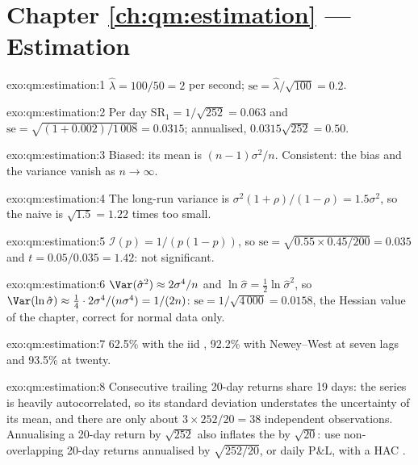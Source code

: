 \section*{Chapter \ref{ch:qm:estimation} --- Estimation}

\begin{solution}{exo:qm:estimation:1}
$\hat\lambda = 100/50 = 2$ per second; $\mathrm{se} = \hat\lambda/\sqrt{100} = 0.2$.
\end{solution}

\begin{solution}{exo:qm:estimation:2}
Per day $\mathrm{SR}_1 = 1/\sqrt{252} = 0.063$ and $\mathrm{se} = \sqrt{(1 + 0.002)/1\,008} = 0.0315$; annualised, $0.0315\sqrt{252} = 0.50$.
\end{solution}

\begin{solution}{exo:qm:estimation:3}
Biased: its mean is $(n - 1)\sigma^2/n$. Consistent: the bias and the variance vanish as $n \to \infty$.
\end{solution}

\begin{solution}{exo:qm:estimation:4}
The long-run variance is $\sigma^2(1 + \rho)/(1 - \rho) = 1.5\sigma^2$, so the naive  is $\sqrt{1.5} = 1.22$ times too small.
\end{solution}

\begin{solution}{exo:qm:estimation:5}
$\mathcal I(p) = 1/(p(1 - p))$, so $\mathrm{se} = \sqrt{0.55 \times 0.45/200} = 0.035$ and $t = 0.05/0.035 = 1.42$: not significant.
\end{solution}

\begin{solution}{exo:qm:estimation:6}
$\Var(\hat\sigma^2) \approx 2\sigma^4/n$ and $\ln\hat\sigma = \tfrac12\ln\hat\sigma^2$, so $\Var(\ln\hat\sigma) \approx \tfrac14 \cdot 2\sigma^4/(n\sigma^4) = 1/(2n)$: $\mathrm{se} =
1/\sqrt{4\,000} = 0.0158$, the Hessian value of the chapter, correct for normal data only.
\end{solution}

\begin{solution}{exo:qm:estimation:7}
62.5\% with the iid , 92.2\% with Newey--West at seven lags and 93.5\% at twenty.
\end{solution}

\begin{solution}{exo:qm:estimation:8}
Consecutive trailing 20-day returns share 19 days: the series is heavily autocorrelated, so its standard deviation understates
the uncertainty of its mean, and there are only about $3 \times 252/20 = 38$ independent observations. Annualising a 20-day return
by $\sqrt{252}$ also inflates the  by $\sqrt{20}$: use non-overlapping 20-day returns annualised by $\sqrt{252/20}$, or daily P\&L,
with a HAC .
\end{solution}

